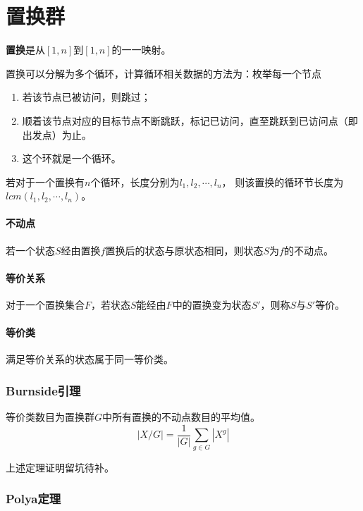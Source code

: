 \section{置换群}
{\bfseries 置换}是从$[1,n]$到$[1,n]$的一一映射。

置换可以分解为多个循环，计算循环相关数据的方法为：枚举每一个节点
\begin{enumerate}
    \item 若该节点已被访问，则跳过；
    \item 顺着该节点对应的目标节点不断跳跃，标记已访问，直至跳跃到已访问点（即出发点）为止。
    \item 这个环就是一个循环。
\end{enumerate}
\begin{theorem}
    若对于一个置换有$n$个循环，长度分别为$l_1,l_2,\cdots,l_n$，
    则该置换的循环节长度为$lcm(l_1,l_2,\cdots,l_n)$。
\end{theorem}
\paragraph{不动点}
若一个状态$S$经由置换$f$置换后的状态与原状态相同，则状态$S$为$f$的不动点。
\paragraph{等价关系}
对于一个置换集合$F$，若状态$S$能经由$F$中的置换变为状态$S'$，则称$S$与$S'$等价。
\paragraph{等价类}
满足等价关系的状态属于同一等价类。

\subsubsection{Burnside引理}
\begin{lemma}
    等价类数目为置换群$G$中所有置换的不动点数目的平均值。
    \begin{displaymath}
        |X/G|=\frac{1}{|G|}\sum_{g\in G}|X^g|
    \end{displaymath}
\end{lemma}
上述定理证明留坑待补。
\subsubsection{Polya定理}


